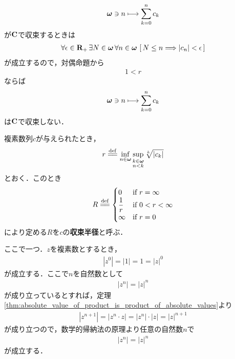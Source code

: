 \begin{sketch}
		\begin{align}
			{\boldsymbol \omega} \ni n \longmapsto \sum_{k=0}^{n} c_{k}
		\end{align}
		が$\mathbf{C}$で収束するときは
		\begin{align}
			\forall \epsilon \in \mathbf{R}_+\, \exists N \in {\boldsymbol \omega}\, \forall n \in {\boldsymbol \omega}\,
			\left[\, N \leq n \Longrightarrow |c_{n}| < \epsilon\, \right]
		\end{align}
		が成立するので，対偶命題から
		\begin{align}
			1 < r
		\end{align}
		ならば
		\begin{align}
			{\boldsymbol \omega} \ni n \longmapsto \sum_{k=0}^{n} c_{k}
		\end{align}
		は$\mathbf{C}$で収束しない．
		\QED
	\end{sketch}
	
	\begin{screen}
		\begin{dfn}[収束半径]
			複素数列$c$が与えられたとき，
			\begin{align}
				r \defeq \inf{n \in \Natural}{\sup{\substack{k \in \Natural \\ n < k}}{\sqrt[k]{|c_{k}|}}}
			\end{align}
			とおく．このとき
			\begin{align}
				R \defeq
				\begin{cases}
					0 & \mbox{if } r = \infty \\
					\displaystyle{\frac{1}{r}} & \mbox{if } \displaystyle{0 < r < \infty} \\
					\infty & \mbox{if } r = 0
				\end{cases}
			\end{align}
			により定める$R$を$c$の{\bf 収束半径}と呼ぶ．
		\end{dfn}
	\end{screen}
	
	ここで一つ．$z$を複素数とするとき，
	\begin{align}
		|z^{0}| = |1| = 1 = |z|^{0}
	\end{align}
	が成立する．ここで$n$を自然数として
	\begin{align}
		|z^{n}| = |z|^{n}
	\end{align}
	が成り立っているとすれば，定理\ref{thm:absolute_value_of_product_is_product_of_absolute_values}より
	\begin{align}
		|z^{n+1}| = |z^{n} \cdot z| = |z^{n}| \cdot |z| = |z|^{n+1}
	\end{align}
	が成り立つので，数学的帰納法の原理より任意の自然数$n$で
	\begin{align}
		|z^{n}| = |z|^{n}
	\end{align}
	が成立する．
	
